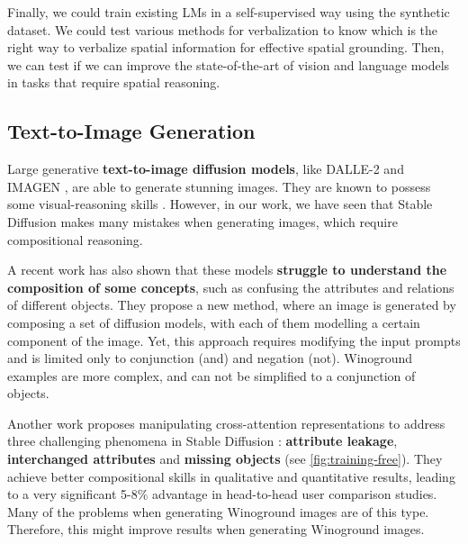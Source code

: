 Finally, we could train existing LMs in a self-supervised way using the synthetic dataset. We could test various methods for verbalization to know which is the right way to verbalize spatial information for effective spatial grounding. Then, we can test if we can improve the state-of-the-art of vision and language models in tasks that require spatial reasoning.

\subsection{Text-to-Image Generation} \label{sec:text-to-image}

Large generative \textbf{text-to-image diffusion models}, like DALLE-2 \cite{ramesh2022hierarchical} and IMAGEN \cite{saharia2022photorealistic}, are able to generate stunning images. They are known to possess some visual-reasoning skills \cite{cho2022dall}. However, in our work, we have seen that Stable Diffusion makes many mistakes when generating images, which require compositional reasoning.

A recent work \cite{liu2022compositional} has also shown that these models \textbf{struggle to understand the composition of some concepts}, such as confusing the attributes and relations of different objects. They propose a new method, where an image is generated by composing a set of diffusion models, with each of them modelling a certain component of the image. Yet, this approach requires modifying the input prompts and is limited only to conjunction (and) and negation (not). Winoground examples are more complex, and can not be simplified to a conjunction of objects.

Another work \cite{anonymous2023trainingfree} proposes manipulating cross-attention representations to address three challenging phenomena in Stable Diffusion \cite{rombach2021highresolution}: \textbf{attribute leakage}, \textbf{interchanged attributes} and \textbf{missing objects} (see \cref{fig:training-free}). They achieve better compositional skills in qualitative and quantitative results, leading to a very significant 5-8\% advantage in head-to-head user comparison studies. Many of the problems when generating Winoground images are of this type. Therefore, this might improve results when generating Winoground images.

